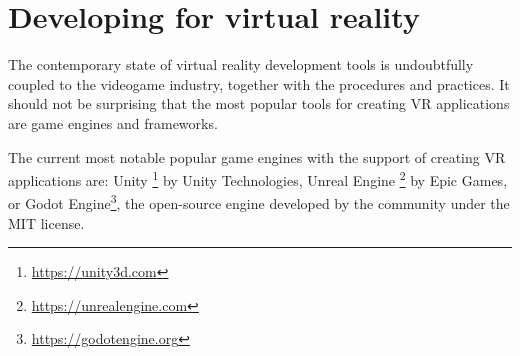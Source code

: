 \hypertarget{x-developing-for-virtual-reality}{\section{Developing for virtual reality}}
The contemporary state of virtual reality development tools is undoubtfully
coupled to the videogame industry, together with the procedures and practices.
It should not be surprising that the most popular tools for creating
VR applications are game engines and frameworks.


The current most notable popular game engines with the support of creating VR
applications are: Unity \footnote{\href{https://unity3d.com}{https://unity3d.com}} by
Unity Technologies, Unreal Engine \footnote{\href{https://unrealengine.com}{https://unrealengine.com}} by
Epic Games, or Godot Engine\footnote{\href{https://godotengine.org}{https://godotengine.org}},
the open-source engine developed by the community under the MIT license.\cite{slantvr}
